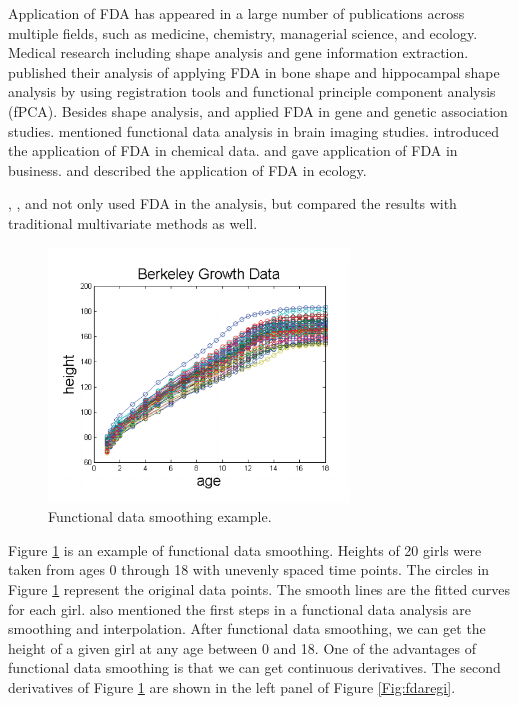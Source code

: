 \documentclass{article}\usepackage[]{graphicx}\usepackage[]{color}
\begin{document}
Application of FDA has appeared in a large number of publications across multiple fields, such as medicine, chemistry, managerial science, and ecology.
Medical research including shape analysis and gene information extraction. 
\citet{epifanio2011functional,epifanio2014hippocampal} published their analysis of applying FDA in bone shape and hippocampal shape analysis by using registration tools and functional principle component analysis (fPCA). Besides shape analysis, \citet{leng2006classification} and \citet{reimherr2014functional} applied FDA in gene and genetic association studies. \citet{tian2010functional} mentioned functional data analysis in brain imaging studies. 
\citet{burfield2015review} introduced the application of FDA in chemical data. 
\citet{dass2012introducing} and \citet{muelas2016facing} gave application of FDA in business. \citet{gorrostieta2014characterization} and \citet{martinez2014air} described the application of FDA in ecology. 


\citet{martinez2014air}, \citet{reimherr2014functional}, and \citet{nikitovic2011functional} not only used FDA in the analysis, but compared the results with traditional multivariate methods as well.

\begin{figure}[!ht]
\centering
\includegraphics[width=8cm]{egsmooth.png}
\caption{Functional data smoothing example. \citep{FDAGiles}}
\label{Fig:fdasmooth}
\end{figure}

Figure \ref{Fig:fdasmooth} is an example of functional data smoothing. Heights of 20 girls were taken from ages 0 through 18 with unevenly spaced time points. The circles in Figure \ref{Fig:fdasmooth} represent the original data points. The smooth lines are the fitted curves for each girl.
\citet{ramsay2006functional} also mentioned the first steps in a functional data analysis are smoothing and interpolation. 
After functional data smoothing, we can get the height of a given girl at any age between 0 and 18. One of the advantages of functional data smoothing is that we can get continuous derivatives. The second derivatives of Figure \ref{Fig:fdasmooth} are shown in the left panel of Figure \ref{Fig:fdaregi}.
\end{document}

